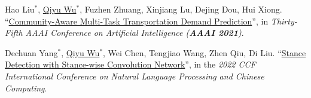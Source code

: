 \documentclass{resume}
\begin{document}
\begin{description}[leftmargin=*]
    \item [{[C2]}] Hao Liu$^*$, \underline{Qiyu Wu$^*$}, Fuzhen Zhuang, Xinjiang Lu, Dejing Dou, Hui Xiong. ``\href{https://ojs.aaai.org/index.php/AAAI/article/view/16107}{Community-Aware Multi-Task Transportation Demand Prediction}'', in \textit{ Thirty-Fifth AAAI Conference on Artificial Intelligence (\textbf{AAAI 2021})}.
    
    \item [{[C1]}] Dechuan Yang$^*$, \underline{Qiyu Wu$^*$}, Wei Chen, Tengjiao Wang, Zhen Qiu, Di Liu. ``\href{https://link.springer.com/chapter/10.1007/978-3-030-60450-9_44}{Stance Detection with Stance-wise Convolution Network}'', in the \textit{2022 CCF International Conference on Natural Language Processing and Chinese Computing}.
  \end{description}




  

\end{document}

